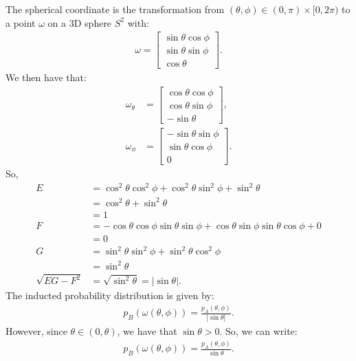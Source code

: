 \documentclass[10pt]{article}
\begin{document}
  The spherical coordinate is the transformation from $(\theta, \phi) \in (0, \pi) \times [0, 2\pi)$ to a point $\omega$ on a 3D sphere $S^2$ with:
  \begin{align*}
    \omega = \begin{bmatrix}
      \sin\theta \cos \phi \\
      \sin\theta \sin \phi \\
      \cos \theta
    \end{bmatrix}.
  \end{align*}
  We then have that:
  \begin{align*}
    \omega_\theta &= \begin{bmatrix}
      \cos\theta \cos\phi \\
      \cos\theta \sin\phi \\
      -\sin\theta
    \end{bmatrix}, \\
    \omega_\phi &= \begin{bmatrix}
      -\sin\theta\sin\phi \\
      \sin\theta \cos\phi \\
      0
    \end{bmatrix}.
  \end{align*}
  So,
  \begin{align*}
    E &= \cos^2 \theta \cos^2 \phi + \cos^2 \theta \sin^2 \phi + \sin^2 \theta \\
    &= \cos^2\theta + \sin^2 \theta \\
    &= 1 \\
    F &= -\cos\theta \cos\phi \sin\theta \sin\phi + \cos\theta \sin\phi \sin\theta \cos\phi + 0\\
    &= 0 \\
    G &= \sin^2 \theta \sin^2 \phi  + \sin^2 \theta \cos^2 \phi \\
    &= \sin^2 \theta\\
    \sqrt{EG - F^2} &= \sqrt{\sin^2\theta} = |\sin\theta|.
  \end{align*}
  The inducted probability distribution is given by:
  \begin{align*}
    p_B(\omega(\theta,\phi)) = \frac{p_A(\theta, \phi)}{|\sin \theta|}.
  \end{align*}
  However, since $\theta \in (0,\theta)$, we have that $\sin \theta > 0$. So, we can write:
  \begin{align*}
    p_B(\omega(\theta,\phi)) = \frac{p_A(\theta, \phi)}{\sin \theta}.
  \end{align*}
\end{document}
